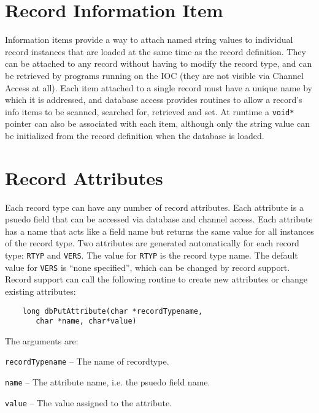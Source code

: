 \section{Record Information Item}
\label{Record Information Item}

Information items provide a way to attach named string values to individual record instances that are loaded at the same time as the record definition.
They can be attached to any record without having to modify the record type, and can be retrieved by programs running on the IOC (they are not visible via Channel Access at all).
Each item attached to a single record must have a unique name by which it is addressed, and database access provides routines to allow a record's info items to be scanned, searched for, retrieved and set.
At runtime a \verb|void*| pointer can also be associated with each item, although only the string value can be initialized from the record definition when the database is loaded.

\section{Record Attributes}

Each record type can have any number of record attributes.
Each attribute is a psuedo field that can be accessed via database and channel access.
Each attribute has a name that acts like a field name but returns the same value for all instances of the record type.
Two attributes are generated automatically for each record type: \verb|RTYP| and \verb|VERS|.
The value for \verb|RTYP| is the record type name.
The default value for \verb|VERS| is ``none specified'', which can be changed by record support.
Record support can call the following routine to create new attributes or change existing attributes:

\begin{verbatim}
    long dbPutAttribute(char *recordTypename,
       char *name, char*value)
\end{verbatim}

The arguments are:

\begin{description}
\item \verb|recordTypename| -- The name of recordtype.
\item \verb|name| -- The attribute name, i.e. the psuedo field name.
\item \verb|value| -- The value assigned to the attribute.
\end{description}

